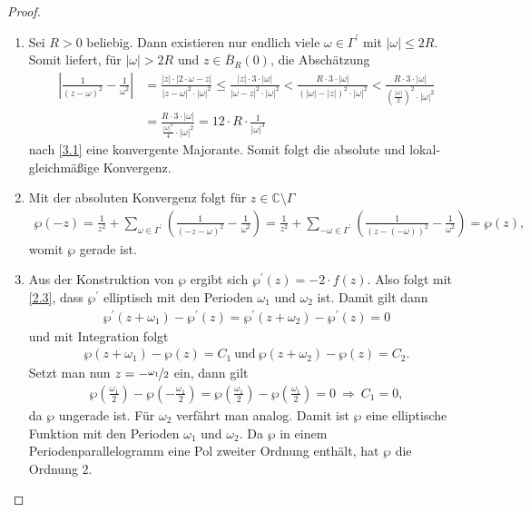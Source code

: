 \begin{proof}
\begin{enumerate}%
\item[(1)] 
Sei $R > 0$ beliebig. Dann existieren nur endlich viele $\omega \in \Gamma^\prime$ mit $|\omega| \leq 2R$.
Somit liefert, für $|\omega| > 2R$ und $z \in \overline B_R(0)$, die Abschätzung
\begin{align*}
\left| \frac{1}{(z-\omega)^2} - \frac{1}{\omega^2} \right|
&= \frac{|z| \cdot | 2 \cdot \omega -z|}{|z-\omega|^2 \cdot |\omega|^2}
\leq \frac{|z| \cdot  3 \cdot| \omega |}{|\omega-z|^2 \cdot |\omega|^2}
< \frac{R \cdot  3 \cdot| \omega |}{\left(|\omega|-|z|\right)^2 \cdot |\omega|^2}
< \frac{R \cdot  3 \cdot| \omega |}{\left(\frac{|\omega|}{2}\right)^2 \cdot |\omega|^2}\\
&= \frac{R \cdot  3 \cdot| \omega |}{\frac{|\omega|^2}{4} \cdot |\omega|^2}
=12 \cdot R \cdot \frac{1}{|\omega|^3}
\end{align*} 
nach \ref{3.1} eine konvergente Majorante. Somit folgt die absolute und lokal-gleichmäßige 
Konvergenz.

\item[(2)]
Mit der absoluten Konvergenz folgt für $z \in \mathbb{C} \setminus \Gamma$
\begin{align*}
\wp(-z) = \frac{1}{z^2} 
+ \sum \limits_{\omega \in \Gamma^\prime} \left( \frac{1}{(-z-\omega)^2}-\frac{1}{\omega^2} \right)
= \frac{1}{z^2} 
+ \sum \limits_{-\omega \in \Gamma^\prime} \left( \frac{1}{(z-(-\omega))^2}-\frac{1}{\omega^2} \right)
= \wp(z),
\end{align*}
womit $\wp$ gerade ist.

\item[(3)]
Aus der Konstruktion von $\wp$ ergibt sich $\wp^\prime(z) = -2\cdot f(z)$.
Also folgt mit \ref{2.3}, dass $\wp^\prime$ elliptisch mit den Perioden $\omega_1$ und $\omega_2$ ist.
Damit gilt dann
\begin{align*}
\wp^\prime(z+\omega_1)-\wp^\prime(z) = \wp^\prime(z+\omega_2)-\wp^\prime(z) = 0
\end{align*}
und mit Integration folgt
\begin{align*}
\wp(z+\omega_1)-\wp(z) = C_1 \ \text{und} \ \wp(z+\omega_2)-\wp(z) = C_2.
\end{align*}
Setzt man nun $z = -\nicefrac{\omega_1}{2}$ ein, dann gilt
\begin{align*}
\wp\left(\frac{\omega_1}{2}\right)-\wp\left(-\frac{\omega_1}{2}\right)
= \wp\left(\frac{\omega_1}{2}\right)-\wp\left(\frac{\omega_1}{2}\right) = 0 \ 
\Rightarrow \ C_1 = 0,
\end{align*}
da $\wp$ ungerade ist. Für $\omega_2$ verfährt man analog.
Damit ist $\wp$ eine elliptische Funktion mit den Perioden $\omega_1$ und $\omega_2$.
Da $\wp$ in einem Periodenparallelogramm eine Pol zweiter Ordnung enthält, hat $\wp$ die Ordnung $2$.
\end{enumerate}
\end{proof}

